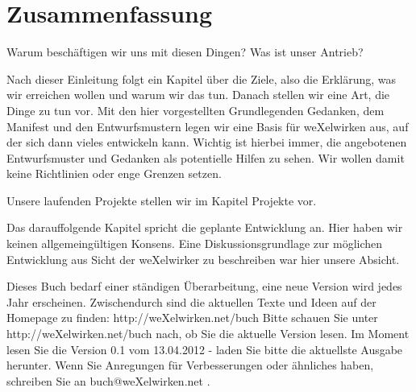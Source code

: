   \section{Zusammenfassung}

Warum beschäftigen wir uns mit diesen Dingen? Was ist unser Antrieb?


Nach dieser Einleitung folgt ein Kapitel über die Ziele, also die Erklärung, was wir erreichen wollen und warum wir das tun.
%
Danach stellen wir eine Art, die Dinge zu tun vor.
%
Mit den hier vorgestellten Grundlegenden Gedanken, dem Manifest und den Entwurfsmustern legen wir eine Basis für weXelwirken aus, auf der sich dann vieles entwickeln kann.
%
Wichtig ist hierbei immer, die angebotenen Entwurfsmuster und Gedanken als potentielle Hilfen zu sehen. 
%
Wir wollen damit keine Richtlinien oder enge Grenzen setzen.



Unsere laufenden Projekte stellen wir im Kapitel Projekte vor.



Das darauffolgende Kapitel spricht die geplante Entwicklung an.
%
Hier haben wir keinen allgemeingültigen Konsens.
%
Eine Diskussionsgrundlage zur möglichen Entwicklung aus Sicht der weXelwirker zu beschreiben war hier unsere Absicht.




Dieses Buch bedarf einer ständigen Überarbeitung, eine neue Version wird jedes Jahr erscheinen.
%
Zwischendurch sind die aktuellen Texte und Ideen auf der Homepage zu finden: http://weXelwirken.net/buch
%
Bitte schauen Sie unter\\ http://weXelwirken.net/buch nach, ob Sie die aktuelle Version lesen.
%
Im Moment lesen Sie die Version 0.1 vom 13.04.2012 - laden Sie bitte die aktuellste Ausgabe herunter.
%
Wenn Sie Anregungen für Verbesserungen oder ähnliches haben, schreiben Sie an buch@weXelwirken.net .
